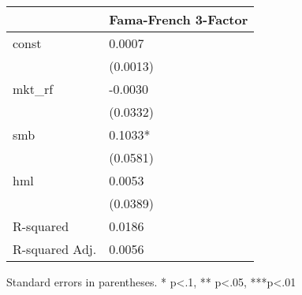 \begin{table}
\caption{}
\label{}
\begin{center}
\begin{tabular}{ll}
\hline
               & Fama-French 3-Factor  \\
\hline
const          & 0.0007                \\
               & (0.0013)              \\
mkt\_rf        & -0.0030               \\
               & (0.0332)              \\
smb            & 0.1033*               \\
               & (0.0581)              \\
hml            & 0.0053                \\
               & (0.0389)              \\
R-squared      & 0.0186                \\
R-squared Adj. & 0.0056                \\
\hline
\end{tabular}
\end{center}
\end{table}
\bigskip
Standard errors in parentheses. \newline 
* p<.1, ** p<.05, ***p<.01